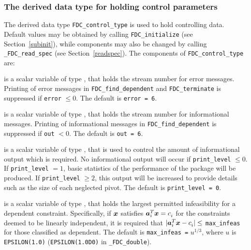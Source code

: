 \documentclass{galahad}
\newcommand{\packagename}{FDC}
\newcommand{\fullpackagename}{\libraryname\_\-\packagename}
\begin{document}

\subsubsection{The derived data type for holding control
 parameters}\label{typecontrol}
The derived data type
{\tt \packagename\_control\_type}
is used to hold controlling data. Default values may be obtained by calling
{\tt \packagename\_initialize}
(see Section~\ref{subinit}),
while components may also be changed by calling
{\tt \fullpackagename\_read\-\_spec}
(see Section~\ref{readspec}).
The components of
{\tt \packagename\_control\_type}
are:

\begin{description}

 is a scalar variable of type \integer, that holds the
stream number for error messages. Printing of error messages in
{\tt \packagename\_find\_dependent} and {\tt \packagename\_terminate}
is suppressed if {\tt error} $\leq 0$.
The default is {\tt error = 6}.

 is a scalar variable of type \integer, that holds the
stream number for informational messages. Printing of informational messages in
{\tt \packagename\_find\_dependent} is suppressed if {\tt out} $< 0$.
The default is {\tt out = 6}.

 is a scalar variable of type \integer, that is used
to control the amount of informational output which is required. No
informational output will occur if {\tt print\_level} $\leq 0$. If
{\tt print\_level} $= 1$, basic statistics of the performance of the
package will be produced. If {\tt print\_level} $\geq 2$, this output will be
increased to provide details such as the size of each neglected pivot.
The default is {\tt print\_level = 0}.



 is a scalar variable of type \realdp, that holds the
largest permitted infeasibility for a dependent constraint. Specifically, if
${\bm{x}}$ satisfies ${\bm{a}}_i^T {\bm{x}} = c_i^{}$ for the constraints deemed to be
linearly independent, it is required that $|{\bm{a}}_i^T {\bm{x}} - c_i^{}| \leq$
{\tt max\_infeas} for those classified as dependent.
The default is {\tt max\_infeas =} $u^{1/3}$,
where $u$ is {\tt EPSILON(1.0)} ({\tt EPSILON(1.0D0)} in
{\tt \fullpackagename\_double}).


\end{description}
\end{document}
